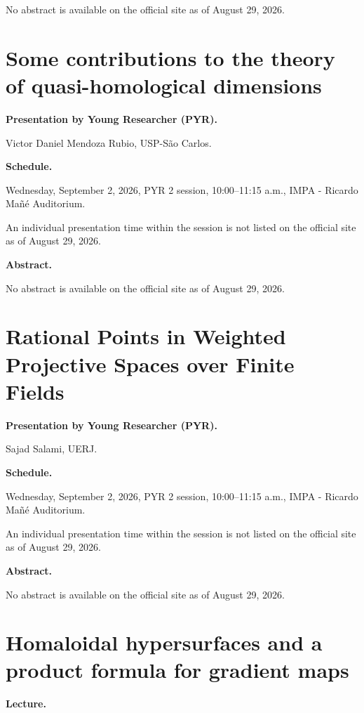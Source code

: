 No abstract is available on the official
site as of August 29, 2026.

\section{Some contributions to the theory
of quasi-homological dimensions}
\label{section-quasi-homological-dimensions}

\medskip\noindent
{\bf Presentation by Young Researcher
(PYR).}

Victor Daniel Mendoza Rubio,
USP-S\~ao Carlos.

\medskip\noindent
{\bf Schedule.}

Wednesday, September 2, 2026,
PYR 2 session, 10:00--11:15 a.m.,
IMPA - Ricardo Ma\~n\'e Auditorium.

An individual presentation time within
the session is not listed on the
official site as of August 29, 2026.

\medskip\noindent
{\bf Abstract.}

No abstract is available on the official
site as of August 29, 2026.

\section{Rational Points in Weighted
Projective Spaces over Finite Fields}
\label{section-rational-points-weighted}

\medskip\noindent
{\bf Presentation by Young Researcher
(PYR).}

Sajad Salami,
UERJ.

\medskip\noindent
{\bf Schedule.}

Wednesday, September 2, 2026,
PYR 2 session, 10:00--11:15 a.m.,
IMPA - Ricardo Ma\~n\'e Auditorium.

An individual presentation time within
the session is not listed on the
official site as of August 29, 2026.

\medskip\noindent
{\bf Abstract.}

No abstract is available on the official
site as of August 29, 2026.

\section{Homaloidal hypersurfaces and a
product formula for gradient maps}
\label{section-homaloidal-hypersurfaces}

\medskip\noindent
{\bf Lecture.}

